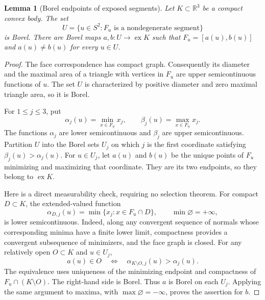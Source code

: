 \documentclass[11pt,letterpaper]{amsart}
\newtheorem{lemma}[theorem]{Lemma}
\theoremstyle{definition}
\theoremstyle{remark}
\numberwithin{equation}{section}
\DeclareMathOperator{\ex}{ex}
\begin{document}
\begin{lemma}[Borel endpoints of exposed segments]\label{lem:segment-endpoints}
Let $K\subset\mathbb R^3$ be a compact convex body. The set
\[
 U=\{u\in S^2:F_u\text{ is a nondegenerate segment}\}
\]
is Borel. There are Borel maps $a,b:U\to\ex K$ such that
$F_u=[a(u),b(u)]$ and $a(u)\ne b(u)$ for every $u\in U$.
\end{lemma}
\begin{proof}
The face correspondence has compact graph. Consequently its diameter
and the maximal area of a triangle with vertices in $F_u$ are upper
semicontinuous functions of $u$. The set $U$ is characterized by
positive diameter and zero maximal triangle area, so it is Borel.

For $1\le j\le3$, put
\[
 \alpha_j(u)=\min_{x\in F_u}x_j,
 \qquad \beta_j(u)=\max_{x\in F_u}x_j.
\]
The functions $\alpha_j$ are lower semicontinuous and $\beta_j$ are
upper semicontinuous. Partition $U$ into the Borel sets $U_j$ on which
$j$ is the first coordinate satisfying $\beta_j(u)>\alpha_j(u)$.
For $u\in U_j$, let $a(u)$ and $b(u)$ be the unique points of $F_u$
minimizing and maximizing that coordinate. They are its two endpoints,
so they belong to $\ex K$.

Here is a direct measurability check, requiring no selection theorem.
For compact $D\subset K$, the extended-valued function
\[
 \alpha_{D,j}(u)=\min\{x_j:x\in F_u\cap D\},
 \qquad \min\varnothing=+\infty,
\]
is lower semicontinuous. Indeed, along any convergent sequence of
normals whose corresponding minima have a finite lower limit, compactness
provides a convergent subsequence of minimizers, and the face graph is
closed. For any relatively open $O\subset K$ and $u\in U_j$,
\[
 a(u)\in O
 \quad\Longleftrightarrow\quad
 \alpha_{K\setminus O,j}(u)>\alpha_j(u).
\]
The equivalence uses uniqueness of the minimizing endpoint and
compactness of $F_u\cap(K\setminus O)$. The right-hand side is Borel.
Thus $a$ is Borel on each $U_j$. Applying the same argument to maxima,
with $\max\varnothing=-\infty$, proves the assertion for $b$.
\end{proof}
\end{document}
